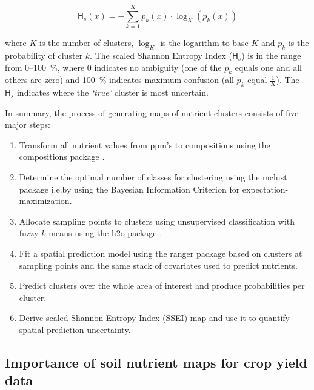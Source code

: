 \begin{linenumbers}
\begin{equation} \label{E:SSEI}
\mathsf{H}_{s}(x) = -\sum_{k=1}^K{ p_k(x) \cdot \log_{K} (p_k(x))} 
\end{equation}

\noindent where $K$ is the number of clusters, $\log_{K}$ is the logarithm to base $K$ and $p_{k}$ is the probability of cluster $k$. The scaled Shannon Entropy Index ($\mathsf{H}_s$) is in the range from 0--\SI{100}{\percent}, where 0 indicates no ambiguity (one of the $p_{k}$ equals one and all others are zero) and \SI{100}{\percent} indicates maximum confusion (all $p_{k}$ equal $\frac{1}{K}$). The $\mathsf{H}_s$ indicates where the \emph{`true'} cluster is most uncertain.\par

In summary, the process of generating maps of nutrient clusters consists of five major steps:

\begin{enumerate}
\item Transform all nutrient values from ppm's to compositions using the \textsf{compositions} package \citep{Boogaart2008compositions}.
\item Determine the optimal number of classes for clustering using the \textsf{mclust} package \citep{fraley2012package} i.e.\@ by using the Bayesian Information Criterion for expectation-maximization.
\item Allocate sampling points to clusters using unsupervised classification with fuzzy $k$-means using the \textsf{h2o} package \citep{Spencer2016}.
\item Fit a spatial prediction model using the \textsf{ranger} package based on clusters at sampling points and the same stack of covariates used to predict nutrients.
\item Predict clusters over the whole area of interest and produce probabilities per cluster.
\item Derive scaled Shannon Entropy Index (SSEI) map and use it to quantify spatial prediction uncertainty.
\end{enumerate}

\subsection{Importance of soil nutrient maps for crop yield data}


\end{linenumbers}
